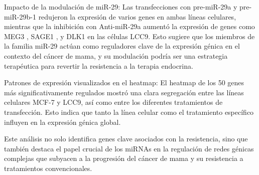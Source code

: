 \documentclass[
]{article}
\begin{document}
Impacto de la modulación de miR-29: Las transfecciones con pre-miR-29a y
pre-miR-29b-1 redujeron la expresión de varios genes en ambas líneas
celulares, mientras que la inhibición con Anti-miR-29a aumentó la
expresión de genes como MEG3 , SAGE1 , y DLK1 en las células LCC9. Esto
sugiere que los miembros de la familia miR-29 actúan como reguladores
clave de la expresión génica en el contexto del cáncer de mama, y su
modulación podría ser una estrategia terapéutica para revertir la
resistencia a la terapia endocrina.

Patrones de expresión visualizados en el heatmap: El heatmap de los 50
genes más significativamente regulados mostró una clara segregación
entre las líneas celulares MCF-7 y LCC9, así como entre los diferentes
tratamientos de transfección. Esto indica que tanto la línea celular
como el tratamiento específico influyen en la expresión génica global.

Este análisis no solo identifica genes clave asociados con la
resistencia, sino que también destaca el papel crucial de los miRNAs en
la regulación de redes génicas complejas que subyacen a la progresión
del cáncer de mama y su resistencia a tratamientos convencionales.
\end{document}
